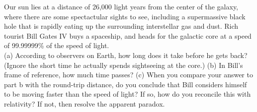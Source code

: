 Our sun lies at a distance of 26,000 light years from the center
of the galaxy, where there are some spectactular sights to see,
including a supermassive black hole that is rapidly eating up the
surrounding interstellar gas and dust. Rich tourist Bill Gates IV
buys a spaceship, and heads for the galactic core at a speed
of 99.99999\% of the speed of light.\\
(a) According to observers on Earth, how long does it take before
he gets back? (Ignore the short time he actually spends sightseeing
at the core.)\answercheck\hwendpart
(b) In Bill's frame of reference, how much time passes?\answercheck\hwendpart
(c) When you compare your answer to part b with the round-trip distance,
do you conclude that Bill considers himself to be moving faster than
the speed of light? If so, how do you reconcile this with
relativity? If not, then resolve the apparent paradox.
